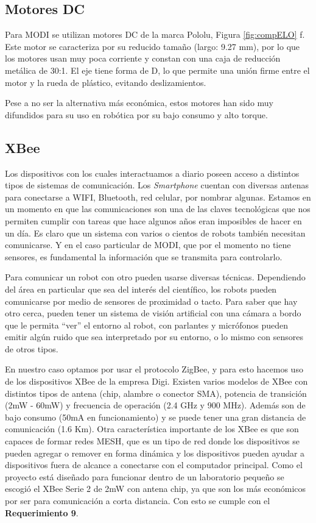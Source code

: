 \subsection{Motores DC}
Para MODI se utilizan motores DC de la marca Pololu, Figura \ref{fig:compELO} f. Este motor se caracteriza por su reducido tamaño (largo: 9.27 mm), por lo que los motores usan muy poca corriente y constan con una caja de reducción metálica de 30:1. El eje tiene forma de D, lo que permite una unión firme entre el motor y la rueda de plástico, evitando deslizamientos.

Pese a no ser la alternativa más económica, estos motores han sido muy difundidos para su uso en robótica por su bajo consumo y alto torque. 
\subsection{XBee}

Los dispositivos con los cuales interactuamos a diario poseen acceso a distintos tipos de sistemas de comunicación. Los \textit{Smartphone} cuentan con diversas antenas para conectarse a WIFI, Bluetooth, red celular,  por nombrar algunas. Estamos en un momento en que las comunicaciones son una de las claves tecnológicas que nos permiten cumplir con tareas que hace algunos años eran imposibles de hacer en un día. Es claro que un sistema con varios o cientos de robots también necesitan comunicarse. Y en el caso particular de MODI, que por el momento no tiene sensores, es fundamental la información que se transmita para controlarlo. 

Para comunicar un robot con otro pueden usarse diversas técnicas. Dependiendo del área en particular que sea del interés del científico, los robots pueden comunicarse por medio de sensores de proximidad o tacto. Para saber que hay otro cerca, pueden tener un sistema de visión artificial con una cámara a bordo que le permita “ver” el entorno al robot, con parlantes y micrófonos pueden emitir algún ruido que sea interpretado por su entorno, o lo mismo con sensores de otros tipos.

En nuestro caso optamos por usar el protocolo ZigBee, y para esto hacemos uso de los dispositivos XBee de la empresa Digi. Existen varios modelos de XBee con distintos tipos de antena (chip, alambre o conector SMA), potencia de transición (2mW - 60mW) y frecuencia de operación (2.4 GHz y 900 MHz). Además son de bajo consumo (50mA en funcionamiento) y se puede tener una gran distancia de comunicación (1.6 Km). Otra característica importante de los XBee es que son capaces de formar redes MESH, que es un tipo de red donde los dispositivos se pueden agregar o remover en forma dinámica y los dispositivos pueden ayudar a dispositivos fuera de alcance a  conectarse con el computador principal. Como el proyecto está diseñado para funcionar dentro de un laboratorio pequeño se escogió el XBee Serie 2 de 2mW con antena chip, ya que son los más económicos por ser para comunicación a corta distancia. Con esto se cumple con el \textbf{Requerimiento 9}.


